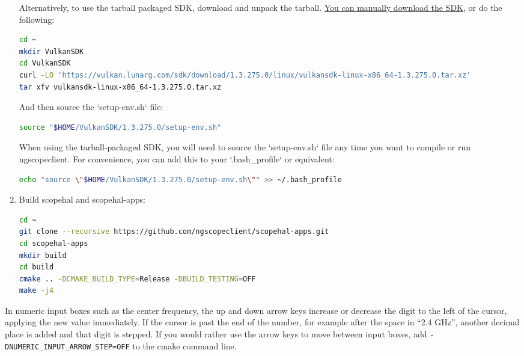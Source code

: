 \begin{enumerate}
Alternatively, to use the tarball packaged SDK, download and unpack the tarball.
\href{https://vulkan.lunarg.com/sdk/home}{You can manually download the SDK}, or do the following:
\begin{lstlisting}[language=sh, numbers=none]
cd ~
mkdir VulkanSDK
cd VulkanSDK
curl -LO 'https://vulkan.lunarg.com/sdk/download/1.3.275.0/linux/vulkansdk-linux-x86_64-1.3.275.0.tar.xz'
tar xfv vulkansdk-linux-x86_64-1.3.275.0.tar.xz
\end{lstlisting}

And then source the `setup-env.sh` file:
\begin{lstlisting}[language=sh, numbers=none]
source "$HOME/VulkanSDK/1.3.275.0/setup-env.sh"
\end{lstlisting}

When using the tarball-packaged SDK, you will need to source the `setup-env.sh` file any time you want to compile
or run ngscopeclient. For convenience, you can add this to your `.bash\_profile` or equivalent:
\begin{lstlisting}[language=sh, numbers=none]
echo "source \"$HOME/VulkanSDK/1.3.275.0/setup-env.sh\"" >> ~/.bash_profile
\end{lstlisting}

\item Build scopehal and scopehal-apps:

\begin{lstlisting}[language=sh, numbers=none]
cd ~
git clone --recursive https://github.com/ngscopeclient/scopehal-apps.git
cd scopehal-apps
mkdir build
cd build
cmake .. -DCMAKE_BUILD_TYPE=Release -DBUILD_TESTING=OFF
make -j4
\end{lstlisting}

\end{enumerate}

In numeric input boxes such as the center frequency, the up and down arrow keys increase or decrease the digit to the
left of the cursor, applying the new value immediately. If the cursor is past the end of the number, for example after
the space in ``2.4 GHz'', another decimal place is added and that digit is stepped. If you would rather use the arrow keys to move between
input boxes, add \texttt{-DNUMERIC\_INPUT\_ARROW\_STEP=OFF} to the cmake command line.

